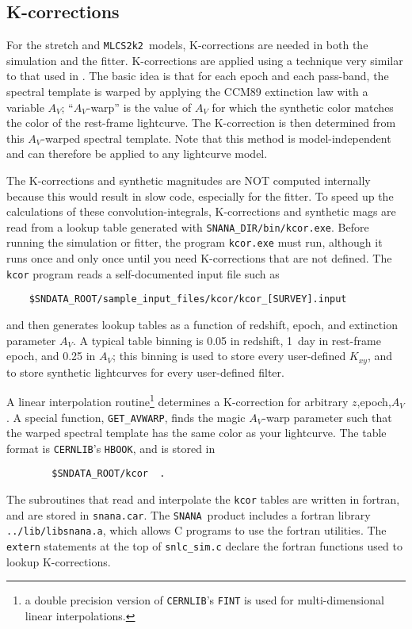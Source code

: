 \documentclass[12pt]{article}
\newcommand{\mlcs}{{\tt MLCS2k2}}
\newcommand{\snana}{{\tt SNANA}}
\newcommand{\snanadir}{{\tt SNANA\_DIR}}
\begin{document}
{%
   \clearpage
   \subsection{K-corrections }
   \label{subsec:simKcor}

For the stretch and \mlcs\ models,
K-corrections are needed in both the simulation and the fitter.
K-corrections are applied using a technique very
similar to that used in \cite{Nugent2002,JRK07}.
The basic idea is that
for each epoch and each pass-band, the spectral template
is warped by applying the CCM89 extinction law with
a variable $A_V$;  ``$A_V$-warp'' is the value
of $A_V$ for which the synthetic color
matches the color of the rest-frame lightcurve.
The K-correction is then determined from this
$A_V$-warped spectral template.
Note that this method is model-independent and can 
therefore be applied to any lightcurve model.


The K-corrections and synthetic magnitudes are NOT computed internally
because this would result in slow code, especially for the fitter.
To speed up the calculations of these convolution-integrals,
K-corrections and synthetic mags are read from a lookup table generated 
with \snanadir{\tt /bin/kcor.exe}.
Before running the simulation or fitter, the program {\tt kcor.exe} 
must run, although it runs once and only once
until you need K-corrections that are not defined.
The {\tt kcor} program reads a self-documented input file 
such as
%
\begin{verbatim}
    $SNDATA_ROOT/sample_input_files/kcor/kcor_[SURVEY].input
\end{verbatim}
%
and then generates lookup tables as a function of
redshift, epoch, and extinction parameter $A_V$.
A typical table binning is 0.05 in redshift,
1~day in rest-frame epoch, and 0.25 in $A_V$;
this binning is used to store every user-defined $K_{xy}$,
and to store synthetic lightcurves for every user-defined filter.

A linear interpolation routine\footnote{ a double precision version
   of {\tt CERNLIB}'s {\tt FINT} is used for multi-dimensional linear
   interpolations.}
determines a K-correction for arbitrary $z$,epoch,$A_V$.
A special function, {\tt GET\_AVWARP}, finds the magic $A_V$-warp
parameter such that the warped spectral template has the same color
as your lightcurve.
The table format is {\tt CERNLIB}'s {\tt HBOOK},
and is stored in 
\begin{verbatim}
        $SNDATA_ROOT/kcor  .
\end{verbatim}
%
The subroutines that read and interpolate the {\tt kcor} tables 
are written in fortran, and are stored in {\tt snana.car}.
The \snana\ product includes a fortran library {\tt ../lib/libsnana.a},
which allows C programs to use the fortran utilities.
The {\tt extern} statements at the top of {\tt snlc\_sim.c}
declare the fortran functions used to lookup K-corrections.

}
\end{document}
